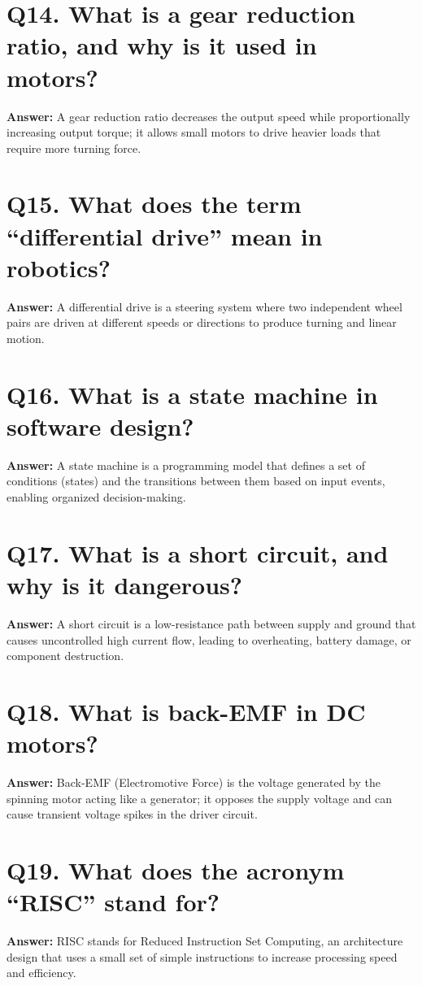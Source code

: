 \documentclass[12pt,a4paper,oneside]{report}
\begin{document}
\section{Q14. What is a gear reduction ratio, and why is it used in motors?}
\textbf{Answer:} A gear reduction ratio decreases the output speed while proportionally increasing output torque; it allows small motors to drive heavier loads that require more turning force.

\section{Q15. What does the term ``differential drive'' mean in robotics?}
\textbf{Answer:} A differential drive is a steering system where two independent wheel pairs are driven at different speeds or directions to produce turning and linear motion.

\section{Q16. What is a state machine in software design?}
\textbf{Answer:} A state machine is a programming model that defines a set of conditions (states) and the transitions between them based on input events, enabling organized decision-making.

\section{Q17. What is a short circuit, and why is it dangerous?}
\textbf{Answer:} A short circuit is a low-resistance path between supply and ground that causes uncontrolled high current flow, leading to overheating, battery damage, or component destruction.

\section{Q18. What is back-EMF in DC motors?}
\textbf{Answer:} Back-EMF (Electromotive Force) is the voltage generated by the spinning motor acting like a generator; it opposes the supply voltage and can cause transient voltage spikes in the driver circuit.

\section{Q19. What does the acronym ``RISC'' stand for?}
\textbf{Answer:} RISC stands for Reduced Instruction Set Computing, an architecture design that uses a small set of simple instructions to increase processing speed and efficiency.
\end{document}
